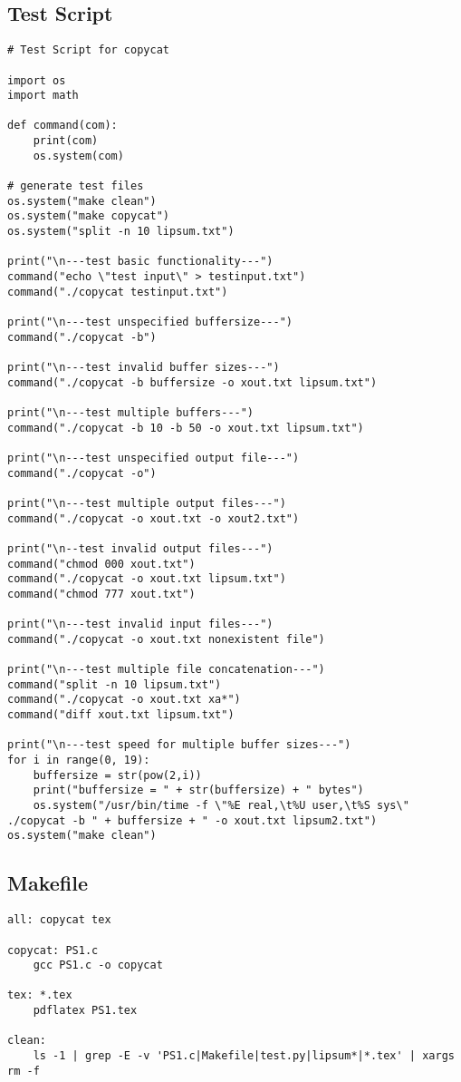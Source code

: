 \documentclass[12pt]{article}
\begin{document}
\subsection{Test Script}
\begin{lstlisting}
# Test Script for copycat

import os
import math

def command(com):
	print(com)
	os.system(com)

# generate test files
os.system("make clean")
os.system("make copycat")
os.system("split -n 10 lipsum.txt")

print("\n---test basic functionality---")
command("echo \"test input\" > testinput.txt")
command("./copycat testinput.txt")

print("\n---test unspecified buffersize---")
command("./copycat -b")

print("\n---test invalid buffer sizes---")
command("./copycat -b buffersize -o xout.txt lipsum.txt")

print("\n---test multiple buffers---")
command("./copycat -b 10 -b 50 -o xout.txt lipsum.txt")

print("\n---test unspecified output file---")
command("./copycat -o")

print("\n---test multiple output files---")
command("./copycat -o xout.txt -o xout2.txt")

print("\n--test invalid output files---")
command("chmod 000 xout.txt")
command("./copycat -o xout.txt lipsum.txt")
command("chmod 777 xout.txt")

print("\n---test invalid input files---")
command("./copycat -o xout.txt nonexistent file")

print("\n---test multiple file concatenation---")
command("split -n 10 lipsum.txt")
command("./copycat -o xout.txt xa*")
command("diff xout.txt lipsum.txt")

print("\n---test speed for multiple buffer sizes---")
for i in range(0, 19):
	buffersize = str(pow(2,i))
	print("buffersize = " + str(buffersize) + " bytes")
	os.system("/usr/bin/time -f \"%E real,\t%U user,\t%S sys\" ./copycat -b " + buffersize + " -o xout.txt lipsum2.txt")
os.system("make clean")
\end{lstlisting}
\subsection{Makefile}

\begin{lstlisting}
all: copycat tex

copycat: PS1.c
	gcc PS1.c -o copycat

tex: *.tex
	pdflatex PS1.tex

clean:
	ls -1 | grep -E -v 'PS1.c|Makefile|test.py|lipsum*|*.tex' | xargs rm -f
\end{lstlisting}
\end{document}
